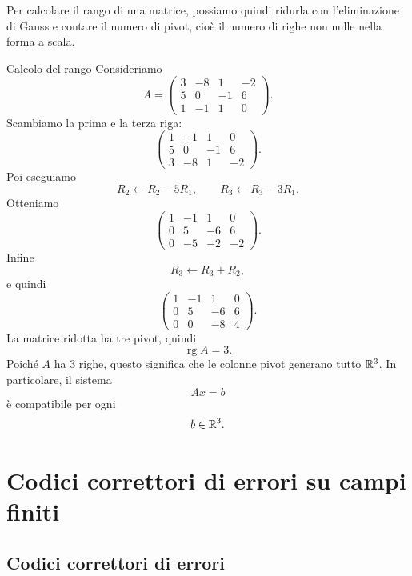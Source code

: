 \documentclass[a4paper]{article}
\begin{document}
Per calcolare il rango di una matrice, possiamo quindi ridurla con l'eliminazione di Gauss e contare il numero di pivot, cioè il numero di righe non nulle nella forma a scala.

\begin{snippetexample}{Calcolo del rango}
    Consideriamo
    \[
        A=
        \begin{pmatrix}
            3 & -8 & 1 & -2\\
            5 & 0 & -1 & 6\\
            1 & -1 & 1 & 0
        \end{pmatrix}.
    \]
    Scambiamo la prima e la terza riga:
    \[
        \begin{pmatrix}
            1 & -1 & 1 & 0\\
            5 & 0 & -1 & 6\\
            3 & -8 & 1 & -2
        \end{pmatrix}.
    \]
    Poi eseguiamo
    \[
        R_2\leftarrow R_2-5R_1,
        \qquad
        R_3\leftarrow R_3-3R_1.
    \]
    Otteniamo
    \[
        \begin{pmatrix}
            1 & -1 & 1 & 0\\
            0 & 5 & -6 & 6\\
            0 & -5 & -2 & -2
        \end{pmatrix}.
    \]
    Infine
    \[
        R_3\leftarrow R_3+R_2,
    \]
    e quindi
    \[
        \begin{pmatrix}
            1 & -1 & 1 & 0\\
            0 & 5 & -6 & 6\\
            0 & 0 & -8 & 4
        \end{pmatrix}.
    \]
    La matrice ridotta ha tre pivot, quindi
    \[
        \operatorname{rg}A=3.
    \]
    Poiché \(A\) ha \(3\) righe, questo significa che le colonne pivot generano tutto \(\mathbb{R}^3\). In particolare, il sistema
    \[
        Ax=b
    \]
    è compatibile per ogni
    \[
        b\in\mathbb{R}^3.
    \]
\end{snippetexample}

\section{Codici correttori di errori su campi finiti}

\subsection{Codici correttori di errori}
\end{document}
